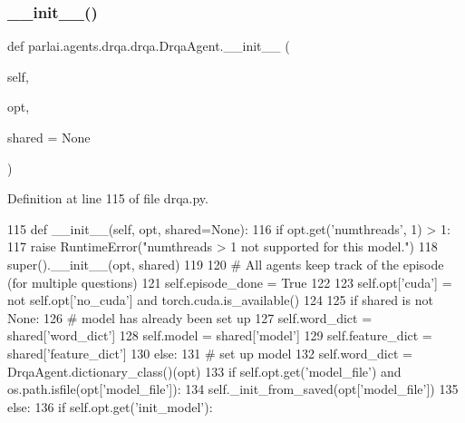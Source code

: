 \subsubsection{\texorpdfstring{\+\_\+\+\_\+init\+\_\+\+\_\+()}{\_\_init\_\_()}}
{\footnotesize\ttfamily def parlai.\+agents.\+drqa.\+drqa.\+Drqa\+Agent.\+\_\+\+\_\+init\+\_\+\+\_\+ (\begin{DoxyParamCaption}\item[{}]{self,  }\item[{}]{opt,  }\item[{}]{shared = {\ttfamily None} }\end{DoxyParamCaption})}



Definition at line 115 of file drqa.\+py.


\begin{DoxyCode}
115     \textcolor{keyword}{def }\_\_init\_\_(self, opt, shared=None):
116         \textcolor{keywordflow}{if} opt.get(\textcolor{stringliteral}{'numthreads'}, 1) > 1:
117             \textcolor{keywordflow}{raise} RuntimeError(\textcolor{stringliteral}{"numthreads > 1 not supported for this model."})
118         super().\_\_init\_\_(opt, shared)
119 
120         \textcolor{comment}{# All agents keep track of the episode (for multiple questions)}
121         self.episode\_done = \textcolor{keyword}{True}
122 
123         self.opt[\textcolor{stringliteral}{'cuda'}] = \textcolor{keywordflow}{not} self.opt[\textcolor{stringliteral}{'no\_cuda'}] \textcolor{keywordflow}{and} torch.cuda.is\_available()
124 
125         \textcolor{keywordflow}{if} shared \textcolor{keywordflow}{is} \textcolor{keywordflow}{not} \textcolor{keywordtype}{None}:
126             \textcolor{comment}{# model has already been set up}
127             self.word\_dict = shared[\textcolor{stringliteral}{'word\_dict'}]
128             self.model = shared[\textcolor{stringliteral}{'model'}]
129             self.feature\_dict = shared[\textcolor{stringliteral}{'feature\_dict'}]
130         \textcolor{keywordflow}{else}:
131             \textcolor{comment}{# set up model}
132             self.word\_dict = DrqaAgent.dictionary\_class()(opt)
133             \textcolor{keywordflow}{if} self.opt.get(\textcolor{stringliteral}{'model\_file'}) \textcolor{keywordflow}{and} os.path.isfile(opt[\textcolor{stringliteral}{'model\_file'}]):
134                 self.\_init\_from\_saved(opt[\textcolor{stringliteral}{'model\_file'}])
135             \textcolor{keywordflow}{else}:
136                 \textcolor{keywordflow}{if} self.opt.get(\textcolor{stringliteral}{'init\_model'}):

\end{DoxyCode}
